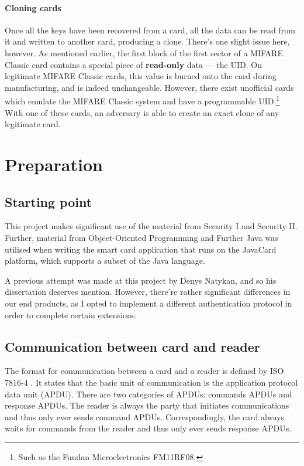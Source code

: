 \documentclass[12pt,a4paper,twoside,openright]{report}
\begin{document}
\subsubsection{Cloning cards}

Once all the keys have been recovered from a card, all the data can be read from it and written to another card, producing a clone. There's one slight issue here, however. As mentioned earlier, the first block of the first sector of a MIFARE Classic card contains a special piece of \textbf{read-only} data --- the UID. On legitimate MIFARE Classic cards, this value is burned onto the card during manufacturing, and is indeed unchangeable. However, there exist unofficial cards which emulate the MIFARE Classic system and have a programmable UID.\footnote{Such as the Fundan Microelectronics FM11RF08.} With one of these cards, an adversary is able to create an exact clone of any legitimate card.

\chapter{Preparation}

\section{Starting point}

This project makes significant use of the material from Security I and Security II. Further, material from Object-Oriented Programming and Further Java was utilised when writing the smart card application that runs on the JavaCard platform, which supports a subset of the Java language.

A previous attempt was made at this project by Denys Natykan, and so his dissertation deserves mention. However, there're rather significant differences in our end products, as I opted to implement a different authentication protocol in order to complete certain extensions.

\section{Communication between card and reader}

The format for communication between a card and a reader is defined by ISO 7816-4 \cite{ISO78164}. It states that the basic unit of communication is the application protocol data unit (APDU). There are two categories of APDUs: commands APDUs and response APDUs. The reader is always the party that initiates communications and thus only ever sends command APDUs. Correspondingly, the card always waits for commands from the reader and thus only ever sends response APDUs.
\end{document}
